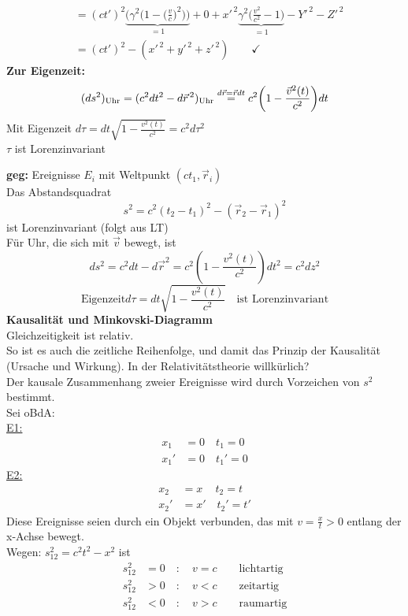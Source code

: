 \documentclass[titlepage,12pt,a4paper,ngerman]{report}
\newcommand{\tx}[1]{\textrm{#1}}
\newcommand{\ub}[1]{\underbrace{#1}}
\begin{document}
{\begin{align*}
&= (ct')^2 \ub{\bigg(\gamma^2 \bigg(1 - \bigg(\frac{v}{c}\bigg)^2\bigg) \bigg)}_{= 1} + 0 + x'^{\, 2} \ub{\gamma^2 \bigg(\frac{v^2}{c^2} - 1\bigg)}_{= 1} - Y'^{\, 2} - Z'^{\, 2}\\
&= (ct')^2 - (x'^{\, 2} + y'^{\, 2} + z'^{\, 2}) \qquad \checkmark
\end{align*}
\textbf{Zur Eigenzeit:}
\begin{equation*}
(ds^2)_{\tx{Uhr}} = (c^2 dt^2 - d\vec{r}^{\, 2})_{\tx{Uhr}} \buildrel d\vec{r} = \vec{r} dt \over = c^2 \bigg(1 - \frac{\vec{v}^2(t)}{c^2}\bigg) dt
\end{equation*}
Mit Eigenzeit $ d\tau = dt \sqrt{1 - \frac{v^2(t)}{c^2}} = c^2 d\tau ^2 $\\
$ \tau $ ist Lorenzinvariant


\textbf{geg:} Ereignisse $ E_i $ mit Weltpunkt $ (ct_1,\vec{r}_i) $\\[5pt]
Das Abstandsquadrat
$$s^2 = c^2(t_2-t_1)^2 - (\vec{r}_2 - \vec{r}_1)^2$$
ist Lorenzinvariant (folgt aus LT)\\[5pt]
Für Uhr, die sich mit $ \vec{v} $ bewegt, ist
$$ds^2 = c^2 dt - d\vec{r}^2 = c^2(1-\frac{v^2(t)}{c^2})dt^2 = c^2 dz^2$$
$$\tx{Eigenzeit} d\tau = dt \sqrt{1-\frac{v^2(t)}{c^2}} \quad \tx{ist Lorenzinvariant}$$
\textbf{Kausalität und Minkovski-Diagramm}\\
Gleichzeitigkeit ist relativ.\\
So ist es auch die zeitliche Reihenfolge, und damit das Prinzip der Kausalität (Ursache und Wirkung). In der Relativitätstheorie willkürlich?\\[5pt]
Der kausale Zusammenhang zweier Ereignisse wird durch Vorzeichen von $ s^2 $ bestimmt.\\
Sei oBdA:\\[5pt]
\underline{E1:}
\begin{align*}
x_1 &= 0\quad t_1 = 0\\
x_1' &= 0\quad t_1' = 0
\end{align*}
\underline{E2:}
\begin{align*}
x_2 &= x \quad \, t_2 = t\\
x_2'&= x' \quad t_2' = t'
\end{align*}
Diese Ereignisse seien durch ein Objekt verbunden, das mit $ v = \frac{x}{t} > 0 $ entlang der x-Achse bewegt.\\
Wegen: $s_{12}^2 = c^2 t^2 - x^2 $ ist
\begin{align*}
s_{12}^2 &= 0 \quad : \quad v = c \qquad \tx{lichtartig}\\
s_{12}^2 &> 0 \quad : \quad v < c \qquad \tx{zeitartig}\\
s_{12}^2 &< 0 \quad : \quad v > c \qquad \tx{raumartig}
\end{align*}

}
\end{document}
